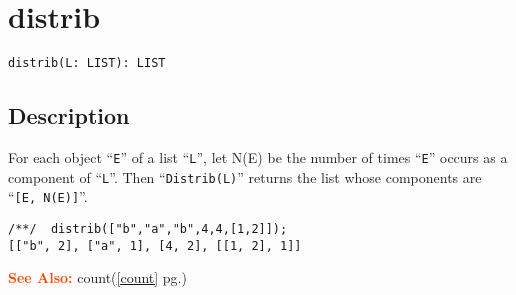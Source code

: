 \documentclass[a4paper]{mybook}
\newenvironment{command}{}{} %
\newcommand\SeeAlso{\par\textcolor{OrangeRed}{\textbf{\large See Also: }}}
\begin{document}
\section{distrib}
\label{distrib}
\begin{command} %


\begin{Verbatim}[label=syntax, rulecolor=\color{MidnightBlue},
frame=single]
distrib(L: LIST): LIST
\end{Verbatim}


\subsection*{Description}

For each object ``\verb&E&'' of a list ``\verb&L&'',
let N(E) be the number of times ``\verb&E&'' occurs as a component of ``\verb&L&''.
Then ``\verb&Distrib(L)&'' returns the list whose components are ``\verb&[E, N(E)]&''.
\begin{Verbatim}[label=example, rulecolor=\color{PineGreen}, frame=single]
/**/  distrib(["b","a","b",4,4,[1,2]]);
[["b", 2], ["a", 1], [4, 2], [[1, 2], 1]]
\end{Verbatim}


\SeeAlso %
  count(\ref{count} pg.\pageref{count})
\end{command} %
\end{document}
